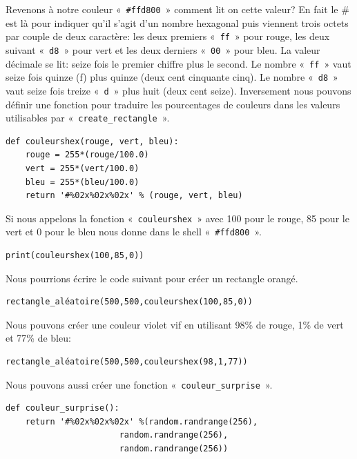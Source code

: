 Revenons à notre couleur «~\texttt{\#ffd800}~» comment lit on cette valeur? En fait le \# est là pour indiquer qu'il s'agit d'un nombre hexagonal puis viennent trois octets par couple de deux caractère: les deux premiers «~\texttt{ff}~» pour rouge, les deux suivant «~\texttt{d8}~» pour vert et les deux derniers «~\texttt{00}~» pour bleu. La valeur décimale se lit: seize fois le premier chiffre plus le second. Le nombre «~\texttt{ff}~» vaut seize fois quinze (f) plus quinze (deux cent cinquante cinq). Le nombre «~\texttt{d8}~» vaut seize fois treize  «~\texttt{d}~» plus huit (deux cent seize). Inversement nous pouvons définir une fonction pour traduire les pourcentages de couleurs dans les valeurs utilisables par «~\texttt{create\_rectangle}~».

\begin{Verbatim}[frame=single,rulecolor=\color{mbleu}, label=à taper]
def couleurshex(rouge, vert, bleu):
    rouge = 255*(rouge/100.0)
    vert = 255*(vert/100.0)
    bleu = 255*(bleu/100.0)
    return '#%02x%02x%02x' % (rouge, vert, bleu)
\end{Verbatim}

Si nous appelons la fonction «~\texttt{couleurshex}~» avec 100 pour le rouge, 85 pour le vert et 0 pour le bleu nous donne dans le shell «~\texttt{\#ffd800}~».

\begin{Verbatim}[frame=single,rulecolor=\color{mbleu}, label=à taper]
print(couleurshex(100,85,0))
\end{Verbatim}

Nous pourrions écrire le code suivant pour créer un rectangle orangé.

\begin{Verbatim}[frame=single,rulecolor=\color{gray}, label=exemple]
rectangle_aléatoire(500,500,couleurshex(100,85,0))
\end{Verbatim}

Nous pouvons créer une couleur violet vif  en utilisant 98\% de rouge, 1\% de vert et 77\% de bleu:
\begin{Verbatim}[frame=single,rulecolor=\color{gray}, label=exemple]
rectangle_aléatoire(500,500,couleurshex(98,1,77))
\end{Verbatim}

Nous pouvons aussi créer une fonction «~\texttt{couleur\_surprise}~».
\begin{Verbatim}[frame=single,rulecolor=\color{mbleu}, label=à taper]
def couleur_surprise():
    return '#%02x%02x%02x' %(random.randrange(256),
                       random.randrange(256),
                       random.randrange(256))
\end{Verbatim}
 
